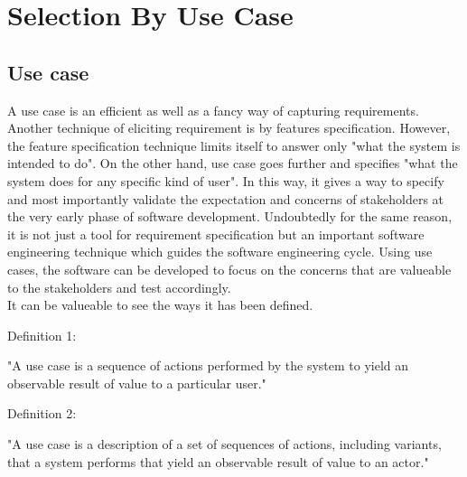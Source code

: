 \chapter{Selection By Use Case}\label{chapter:selection_by_use_case}
\section{Use case}\label{section:selection_by_use_case/use_case}
A use case is an efficient as well as a fancy way of capturing requirements. Another technique of eliciting requirement is by features specification. However, the feature specification technique limits itself to answer only "what the system is intended to do". On the other hand, use case goes further and specifies "what the system does for any specific kind of user". In this way, it gives a way to specify and most importantly validate the expectation and concerns of stakeholders at the very early phase of software development. Undoubtedly for the same reason, it is not just a tool for requirement specification but an important software engineering technique which guides the software engineering cycle. Using use cases, the software can be developed to focus on the concerns that are valueable to the stakeholders and test accordingly.\cite{Ng:2004aa}
\\
It can be valueable to see the ways it has been defined.
\begin{shaded}Definition 1: \cite{Jacobson:1987aa} \end{shaded}
"A use case is a sequence of actions performed by the system to yield an observable result of value to a particular user." 
\\
\begin{shaded}Definition 2: \cite{Rumbaugh:1999aa}\end{shaded}
"A use case is a description of a set of sequences of actions, including variants, that a system performs that yield an observable result of value to an actor."


